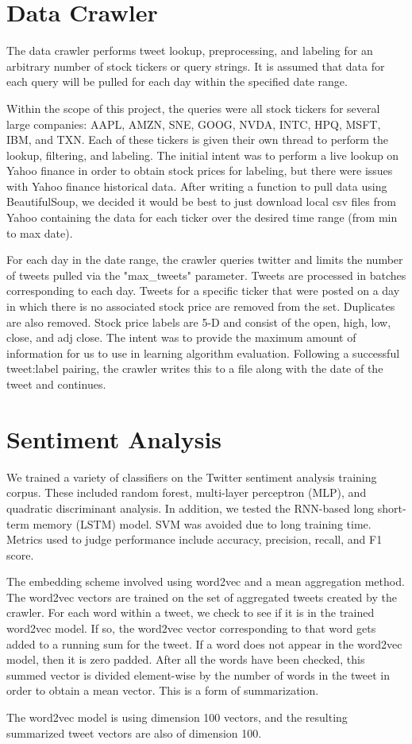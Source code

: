 \documentclass[11pt,a4paper]{article}
\begin{document}
\section{Data Crawler}
The data crawler performs tweet lookup, preprocessing, and labeling for an arbitrary number of stock tickers or query strings. It is assumed that data for each query will be pulled for each day within the specified date range. 
\par
Within the scope of this project, the queries were all stock tickers for several large companies: AAPL, AMZN, SNE, GOOG, NVDA, INTC, HPQ, MSFT, IBM, and TXN. Each of these tickers is given their own thread to perform the lookup, filtering, and labeling. The initial intent was to perform a live lookup on Yahoo finance in order to obtain stock prices for labeling, but there were issues with Yahoo finance historical data. After writing a function to pull data using BeautifulSoup, we decided it would be best to just download local csv files from Yahoo containing the data for each ticker over the desired time range (from min to max date). 
\par 
For each day in the date range, the crawler queries twitter and limits the number of tweets pulled via the "max\_tweets" parameter.  Tweets are processed in batches corresponding to each day. Tweets for a specific ticker that were posted on a day in which there is no associated stock price are removed from the set. Duplicates are also removed. Stock price labels are 5-D and consist of the open, high, low, close, and adj close. The intent was to provide the maximum amount of information for us to use in learning algorithm evaluation. Following a successful tweet:label pairing, the crawler writes this to a file along with the date of the tweet and continues.

\section{Sentiment Analysis}
We trained a variety of classifiers on the Twitter sentiment analysis training corpus. These included random forest, multi-layer perceptron (MLP), and quadratic discriminant analysis. In addition, we tested the RNN-based long short-term memory (LSTM) model. SVM was avoided due to long training time. Metrics used to judge performance include accuracy, precision, recall, and F1 score. 
\par
The embedding scheme involved using word2vec and a mean aggregation method. The word2vec vectors are trained on the set of aggregated tweets created by the crawler. For each word within a tweet, we check to see if it is in the trained word2vec model. If so, the word2vec vector corresponding to that word gets added to a running sum for the tweet. If a word does not appear in the word2vec model, then it is zero padded. After all the words have been checked, this summed vector is divided element-wise by the number of words in the tweet in order to obtain a mean vector. This is a form of summarization. 
\par
The word2vec model is using dimension 100 vectors, and the resulting summarized tweet vectors are also of dimension 100.
\end{document}
